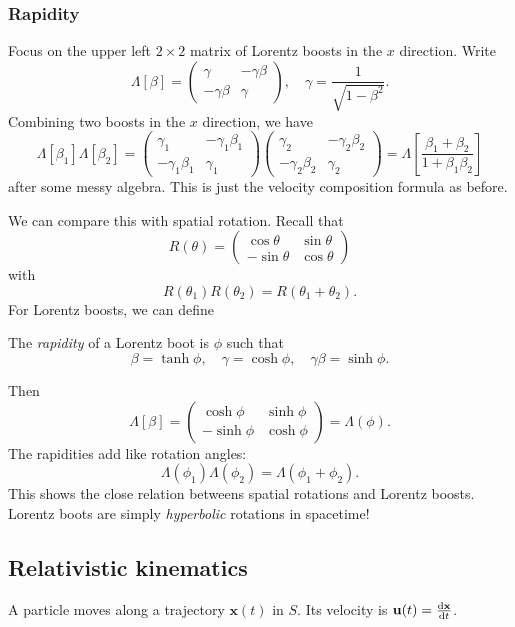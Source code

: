 \documentclass[a4paper]{article}
\begin{document}
\subsubsection{Rapidity}
Focus on the upper left $2\times 2$ matrix of Lorentz boosts in the $x$ direction. Write
\[
  \Lambda[\beta] = 
  \begin{pmatrix}
    \gamma & -\gamma\beta\\
    -\gamma\beta & \gamma
  \end{pmatrix}
  ,\quad
  \gamma = \frac{1}{\sqrt{1 - \beta^2}}.
\]
Combining two boosts in the $x$ direction, we have
\[
  \Lambda[\beta_1]\Lambda[\beta_2] = 
  \begin{pmatrix}
    \gamma_1 & -\gamma_1\beta_1\\
    -\gamma_1\beta_1 & \gamma_1
  \end{pmatrix}
  \begin{pmatrix}
    \gamma_2 & -\gamma_2\beta_2\\
    -\gamma_2\beta_2 & \gamma_2
  \end{pmatrix}
  = \Lambda\left[\frac{\beta_1 + \beta_2}{1 + \beta_1\beta_2}\right]
\]
after some messy algebra. This is just the velocity composition formula as before.

We can compare this with spatial rotation. Recall that
\[
  R(\theta) =
  \begin{pmatrix}
    \cos \theta & \sin \theta\\
    -\sin \theta & \cos \theta
  \end{pmatrix}
\]
with
\[
  R(\theta_1)R(\theta_2) = R(\theta_1 + \theta_2).
\]
For Lorentz boosts, we can define
\begin{defi}[Rapidity]
  The \emph{rapidity} of a Lorentz boot is $\phi$ such that
  \[
    \beta = \tanh \phi,\quad \gamma = \cosh\phi,\quad \gamma\beta=\sinh \phi.
  \]
\end{defi}
Then
\[
  \Lambda[\beta] =
  \begin{pmatrix}
    \cosh \phi & \sinh \phi\\
    -\sinh \phi & \cosh \phi
  \end{pmatrix}
  = \Lambda(\phi).
\]
The rapidities add like rotation angles:
\[
  \Lambda(\phi_1)\Lambda(\phi_2) = \Lambda(\phi_1 + \phi_2).
\]
This shows the close relation betweens spatial rotations and Lorentz boosts. Lorentz boots are simply \emph{hyperbolic} rotations in spacetime!

\subsection{Relativistic kinematics}
A particle moves along a trajectory $\mathbf{x}(t)$ in $S$. Its velocity is $\mathbf{u}(t) = \frac{\mathrm{d} \mathbf{x}}{\mathrm{d} t}$.
\end{document}
